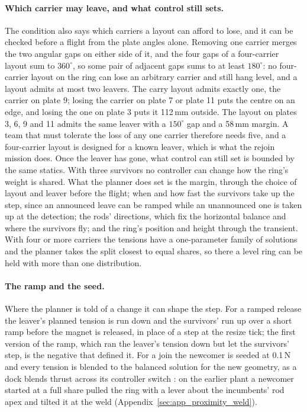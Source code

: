 \paragraph{Which carrier may leave, and what control still sets.} The condition also says which carriers a layout
can afford to lose, and it can be checked before a flight from the plate angles alone. Removing one carrier merges
the two angular gaps on either side of it, and the four gaps of a four-carrier layout sum to $360^\circ$, so some
pair of adjacent gaps sums to at least $180^\circ$: no four-carrier layout on the ring can lose an arbitrary
carrier and still hang level, and a layout admits at most two leavers. The carry layout admits exactly one, the
carrier on plate 9; losing the carrier on plate 7 or plate 11 puts the centre on an edge, and losing the one on plate
3 puts it 112\,mm outside. The layout on plates 3, 6, 9 and 11 admits the same leaver with a $150^\circ$ gap and a
58\,mm margin. A team that must tolerate the loss of any one carrier therefore needs five, and a four-carrier layout
is designed for a known leaver, which is what the rejoin mission does.
Once the leaver has gone, what control can still set is bounded by the same statics. With three survivors no
controller can change how the ring's weight is shared. What the planner does set is the margin, through the choice
of layout and leaver before the flight; when and how fast the survivors take up the step, since an announced leave
can be ramped while an unannounced one is taken up at the detection; the rods' directions, which fix the horizontal
balance and where the survivors fly; and the ring's position and height through the transient. With four or more
carriers the tensions have a one-parameter family of solutions and the planner takes the split closest to equal
shares, so there a level ring can be held with more than one distribution.

\paragraph{The ramp and the seed.} Where the planner is told of a change it can shape the step. For a ramped
release the leaver's planned tension is run down and the survivors' run up over a short ramp before the magnet is
released, in place of a step at the resize tick; the first version of the ramp, which ran the leaver's tension
down but let the survivors' step, is the negative that defined it. For a join the newcomer is seeded at 0.1\,N and
every tension is blended to the balanced solution for the new geometry, as a dock blends thrust across its
controller switch \cite{sugihara2023trady}: on the earlier plant a newcomer started at a full share pulled the ring
with a lever about the incumbents' rod apex and tilted it at the weld (Appendix~\ref{sec:app_proximity_weld}).

